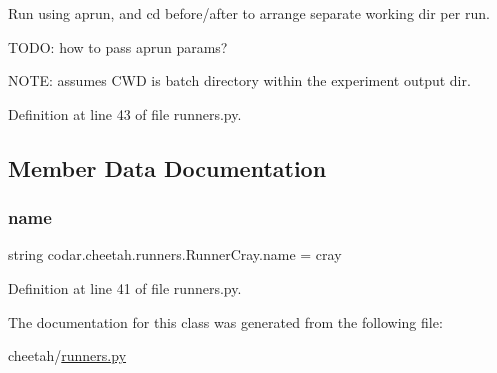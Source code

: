 \begin{DoxyVerb}Run using aprun, and cd before/after to arrange separate working
dir per run.

TODO: how to pass aprun params?

NOTE: assumes CWD is batch directory within the experiment output dir.
\end{DoxyVerb}
 

Definition at line 43 of file runners.\+py.



\subsection{Member Data Documentation}
\mbox{\label{classcodar_1_1cheetah_1_1runners_1_1_runner_cray_af39659e3752a349dcac224089a410a0f}} 
\subsubsection{\texorpdfstring{name}{name}}
{\footnotesize\ttfamily string codar.\+cheetah.\+runners.\+Runner\+Cray.\+name = \textquotesingle{}cray\textquotesingle{}\hspace{0.3cm}{\ttfamily [static]}}



Definition at line 41 of file runners.\+py.



The documentation for this class was generated from the following file\+:\begin{DoxyCompactItemize}
\item 
cheetah/\hyperlink{cheetah_2runners_8py}{runners.\+py}\end{DoxyCompactItemize}
